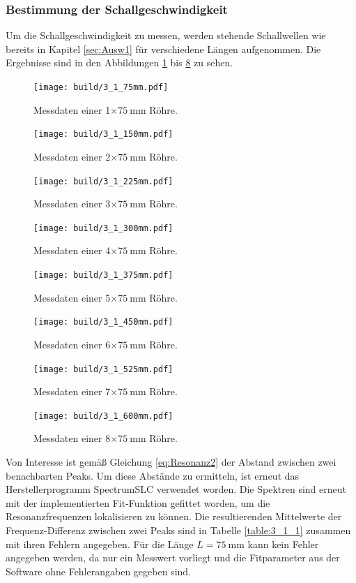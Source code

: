 \subsubsection{Bestimmung der Schallgeschwindigkeit}
\label{sec:Schallgeschwindigkeit}
Um die Schallgeschwindigkeit zu messen, werden stehende Schallwellen wie bereits in Kapitel \ref{sec:Ausw1} für verschiedene Längen aufgenommen. Die Ergebnisse sind in den Abbildungen \ref{fig:2_20} bis \ref{fig:2_27} zu sehen.
\begin{figure}
  \centering  \texttt{[image: build/3\_1\_75mm.pdf]}  \caption{Messdaten einer 1$\times\SI{75}{\milli\meter}$ Röhre.} \label{fig:2_20}
\end{figure}
\begin{figure}
  \centering  \texttt{[image: build/3\_1\_150mm.pdf]}  \caption{Messdaten einer 2$\times\SI{75}{\milli\meter}$ Röhre.} \label{fig:2_21}
\end{figure}
\begin{figure}
  \centering  \texttt{[image: build/3\_1\_225mm.pdf]}  \caption{Messdaten einer 3$\times\SI{75}{\milli\meter}$ Röhre.} \label{fig:2_22}
\end{figure}
\begin{figure}
  \centering  \texttt{[image: build/3\_1\_300mm.pdf]}  \caption{Messdaten einer 4$\times\SI{75}{\milli\meter}$ Röhre.} \label{fig:2_23}
\end{figure}
\begin{figure}
  \centering  \texttt{[image: build/3\_1\_375mm.pdf]}  \caption{Messdaten einer 5$\times\SI{75}{\milli\meter}$ Röhre.} \label{fig:2_24}
\end{figure}
\begin{figure}
  \centering  \texttt{[image: build/3\_1\_450mm.pdf]}  \caption{Messdaten einer 6$\times\SI{75}{\milli\meter}$ Röhre.} \label{fig:2_25}
\end{figure}
\begin{figure}
  \centering  \texttt{[image: build/3\_1\_525mm.pdf]}  \caption{Messdaten einer 7$\times\SI{75}{\milli\meter}$ Röhre.} \label{fig:2_26}
\end{figure}
\begin{figure}
  \centering  \texttt{[image: build/3\_1\_600mm.pdf]}  \caption{Messdaten einer 8$\times\SI{75}{\milli\meter}$ Röhre.} \label{fig:2_27}
\end{figure}
Von Interesse ist gemäß Gleichung \eqref{eq:Resonanz2} der Abstand zwischen zwei benachbarten Peaks. Um diese Abstände zu ermitteln, ist erneut das Herstellerprogramm SpectrumSLC verwendet worden. Die Spektren sind erneut mit der implementierten Fit-Funktion gefittet worden, um die Resonanzfrequenzen lokalisieren zu können. Die resultierenden Mittelwerte der Frequenz-Differenz zwischen zwei Peaks sind in Tabelle \ref{table:3_1_1} zusammen mit ihren Fehlern angegeben. Für die Länge $L=\SI{75}{\milli\meter}$ kann kein Fehler angegeben werden, da nur ein Messwert vorliegt und die Fitparameter aus der Software ohne Fehlerangaben gegeben sind.
